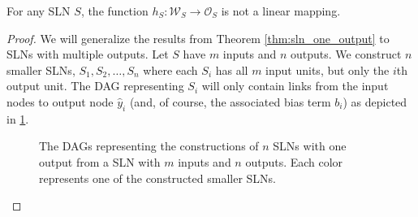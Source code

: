 \begin{corollary}
    \label{col:weight_output_sln}
    For any SLN $S$, the function $h_S: \mathcal{W}_S \rightarrow \mathcal{O}_S$ is not a linear mapping.
\end{corollary}
\begin{proof}
    We will generalize the results from Theorem \ref{thm:sln_one_output} to SLNs with multiple outputs.
    Let $S$ have $m$ inputs and $n$ outputs.
    We construct $n$ smaller SLNs, $S_1,S_2,\dots,S_n$ where each $S_i$ has all $m$ input units, but only the $i$th output unit. 
    The DAG representing $S_i$ will only contain links from the input nodes to output node $\hat{y}_i$ (and, of course, the associated bias term $b_i$) as depicted in \ref{fig:sln_m_in_n_out_construction}.
    \begin{figure}
        \begin{center}
        \end{center}
        \caption{The DAGs representing the constructions of $n$ SLNs with one output from a SLN with $m$ inputs and $n$ outputs. Each color represents one of the constructed smaller SLNs.}
        \label{fig:sln_m_in_n_out_construction}
    \end{figure}
    

\end{proof}
